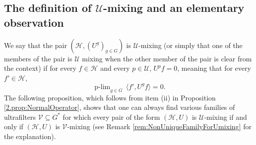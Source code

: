 \documentclass[graybox]{svmult}
\theoremstyle{definition}
\newcommand{\plimgG}[3]{\mathop {#1\text{-lim}}_{#2\in #3}\,}
\begin{document}
\subsection{The definition of \texorpdfstring{$\mathcal U$}{\mathcal U}-mixing and an elementary observation}
We say that the pair $(\mathcal H,(U^g)_{g\in G})$ is $\mathcal U$-mixing (or simply that one of the members of the pair is $\mathcal U$ mixing when the other member of the pair is clear from the context) if for every $f\in \mathcal H$ and every $p\in\mathcal U$, $U^pf=0$, meaning that for every $f'\in\mathcal H$, 
$$
\plimgG{p}{g}{G}\langle f',U^gf\rangle=0.
$$
The following proposition, which follows from item (ii) in Proposition \ref{2.prop:NormalOperator}, shows that one can always find various families of ultrafilters $\mathcal V\subseteq G^*$ for which every pair of the form $(\mathcal H,U)$ is $\mathcal U$-mixing if and only if  $(\mathcal H,U)$ is $\mathcal V$-mixing (see Remark \ref{rem:NonUniqueFamilyForUmixing} for the explanation). 
\end{document}
